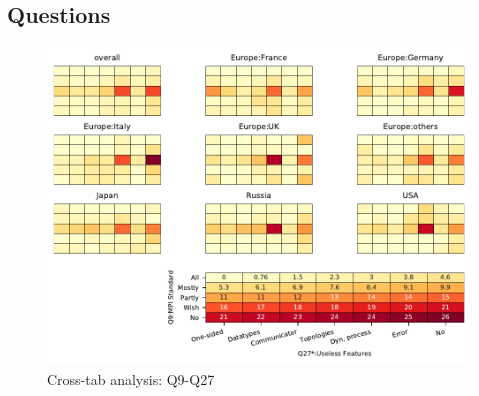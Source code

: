 
\subsection{Questions}


\begin{figure}
\begin{center}
\includegraphics[width=12cm]{../pdfs/Q9-Q27.pdf}
\caption{Cross-tab analysis: Q9-Q27}
\label{fig:Q9-Q27}
\end{center}
\end{figure}
